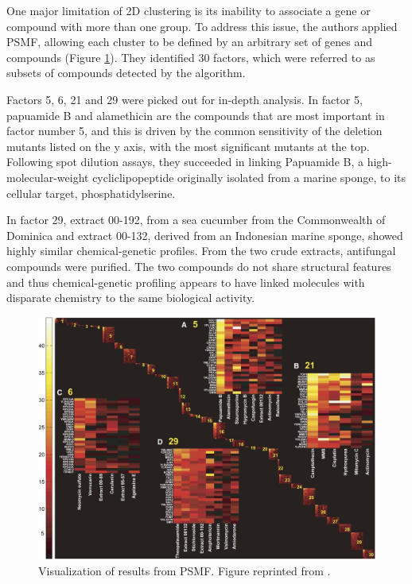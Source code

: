 \documentclass[12pt,conference,compsocconf]{../IEEEtran}
\begin{document}
One major limitation of 2D clustering is its inability to associate a gene or compound with more than one group. To address this issue, the authors applied PSMF, allowing each cluster to be defined by an arbitrary set of genes and compounds (Figure \ref{fig:1078-2}). They identified 30 factors, which were referred to as subsets of compounds detected by the algorithm.

Factors 5, 6, 21 and 29 were picked out for in-depth analysis. In factor 5, papuamide B and alamethicin are the compounds that are most important in factor number 5, and this is driven by the common sensitivity of the deletion mutants listed on the y axis, with the most significant mutants at the top. Following spot dilution assays, they succeeded in linking Papuamide B, a high-molecular-weight cycliclipopeptide originally isolated from a marine sponge, to its cellular target, phosphatidylserine.

In factor 29, extract 00-192, from a sea cucumber from the Commonwealth of Dominica and extract 00-132, derived from an Indonesian marine sponge, showed highly similar chemical-genetic profiles. From the two crude extracts, antifungal compounds were purified. The two compounds do not share structural features and thus chemical-genetic profiling appears to have linked molecules with disparate chemistry to the same biological activity.

\begin{figure}
\centering
\includegraphics[width=\linewidth]{1078-2.png}
\caption{Visualization of results from PSMF. Figure reprinted from \citep{1078}.}
\label{fig:1078-2}
\end{figure}
\end{document}

